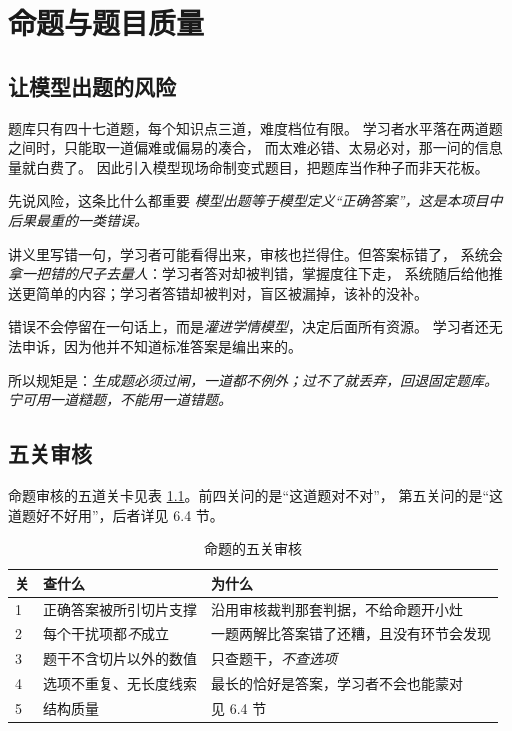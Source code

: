 \chapter{命题与题目质量}

\section{让模型出题的风险}

题库只有四十七道题，每个知识点三道，难度档位有限。
学习者水平落在两道题之间时，只能取一道偏难或偏易的凑合，
而太难必错、太易必对，那一问的信息量就白费了。
因此引入模型现场命制变式题目，把题库当作种子而非天花板。

\begin{keynote}{先说风险，这条比什么都重要}
\emph{模型出题等于模型定义“正确答案”，这是本项目中后果最重的一类错误。}

讲义里写错一句，学习者可能看得出来，审核也拦得住。但答案标错了，
系统会\emph{拿一把错的尺子去量人}：学习者答对却被判错，掌握度往下走，
系统随后给他推送更简单的内容；学习者答错却被判对，盲区被漏掉，该补的没补。

错误不会停留在一句话上，而是\emph{灌进学情模型}，决定后面所有资源。
学习者还无法申诉，因为他并不知道标准答案是编出来的。

所以规矩是：\emph{生成题必须过闸，一道都不例外；过不了就丢弃，回退固定题库。
宁可用一道糙题，不能用一道错题。}
\end{keynote}

\section{五关审核}

命题审核的五道关卡见表 \ref{tab:vet}。前四关问的是“这道题对不对”，
第五关问的是“这道题好不好用”，后者详见 6.4 节。

\begin{table}[htbp]\centering\small
\caption{命题的五关审核}\label{tab:vet}
\begin{tabular}{@{}p{0.8cm}p{4.4cm}p{6.4cm}@{}}
\toprule
关 & 查什么 & 为什么 \\
\midrule
1 & 正确答案被所引切片支撑 & 沿用审核裁判那套判据，不给命题开小灶 \\
2 & 每个干扰项都\emph{不}成立 & 一题两解比答案错了还糟，且没有环节会发现 \\
3 & 题干不含切片以外的数值 & 只查题干，\emph{不查选项} \\
4 & 选项不重复、无长度线索 & 最长的恰好是答案，学习者不会也能蒙对 \\
5 & 结构质量 & 见 6.4 节 \\
\bottomrule
\end{tabular}
\end{table}

